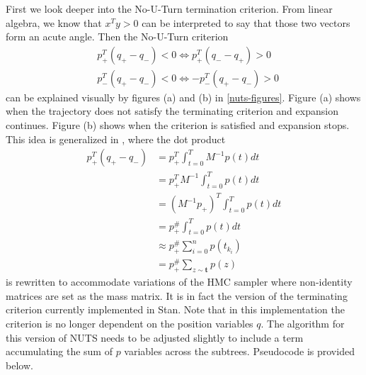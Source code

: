 \documentclass[12pt]{report}
\begin{document}
First we look deeper into the No-U-Turn termination criterion. From linear algebra, we know that $x^Ty > 0 $ can be interpreted to say that those two vectors form an acute angle. Then the No-U-Turn criterion 
\begin{align*}
&p_{+}^T (q_+ -q_-) < 0 \Leftrightarrow p_+^T (q_- - q_+) > 0 \\
&p_{-}^T (q_+ -q_-) < 0 \Leftrightarrow -p_-^T (q_+ - q_-) > 0 
\end{align*}
can be explained visually by figures (a) and (b) in \ref{nuts-figures}. Figure (a) shows when the trajectory does not satisfy the terminating criterion and expansion continues. Figure (b) shows when the criterion is satisfied and expansion stops. This idea is generalized in \cite{betancourt2013generalizing}, where the dot product 
\begin{align*}
 p_{+}^T (q_{+} -q_{-})  
 &=p_{+}^T \int_{t=0}^{T} M^{-1}p(t) dt   \\
 &=p_{+}^T M^{-1} \int_{t=0}^{T} p(t)dt \\
 &=(M^{-1} p_{+})^T  \int_{t=0}^{T} p(t)dt \\
 &= p^{\#}_{+}  \int_{t=0}^{T} p(t)dt \\
 &\approx p^{\#}_{+} \sum_{i=0}^n p(t_{k_i}) \\
 &=  p^{\#}_{+} \sum_{z \sim \mathbf{t}} p(z) 
\end{align*} 
is rewritten to accommodate variations of the HMC sampler where non-identity matrices are set as the mass matrix. It is in fact the version of the terminating criterion currently implemented in Stan. Note that in this implementation the criterion is no longer dependent on the position variables $q$. The algorithm for this version of NUTS needs to be adjusted slightly to include a term accumulating the sum of $p$ variables across the subtrees. Pseudocode is provided below.
\SetAlFnt{\footnotesize}
\end{document}
